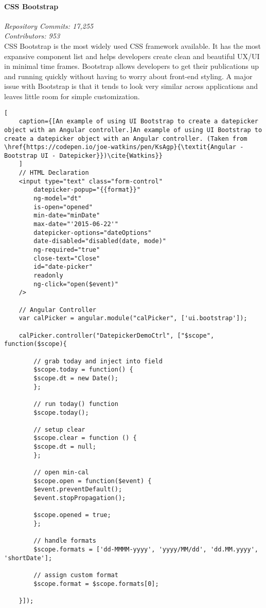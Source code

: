 \paragraph{CSS Bootstrap}
\textit{Repository Commits: 17,255}\\ 
\textit{Contributors: 953}\\
CSS Bootstrap is the most widely used CSS framework available. It has the most expansive component list and helps developers create clean and beautiful UX/UI in minimal time frames. Bootstrap allows developers to get their publications up and running quickly without having to worry about front-end styling. A major issue with Bootstrap is that it tends to look very similar across applications and leaves little room for simple customization.\\
\begin{lstlisting}[
    caption={[An example of using UI Bootstrap to create a datepicker object with an Angular controller.]An example of using UI Bootstrap to create a datepicker object with an Angular controller. (Taken from \href{https://codepen.io/joe-watkins/pen/KsAgp}{\textit{Angular - Bootstrap UI - Datepicker}})\cite{Watkins}}
    ]
    // HTML Declaration
    <input type="text" class="form-control" 
        datepicker-popup="{{format}}" 
        ng-model="dt" 
        is-open="opened" 
        min-date="minDate" 
        max-date="'2015-06-22'"
        datepicker-options="dateOptions" 
        date-disabled="disabled(date, mode)" 
        ng-required="true" 
        close-text="Close" 
        id="date-picker" 
        readonly
        ng-click="open($event)"
    />

    // Angular Controller
    var calPicker = angular.module("calPicker", ['ui.bootstrap']);
    
    calPicker.controller("DatepickerDemoCtrl", ["$scope", function($scope){
        
        // grab today and inject into field
        $scope.today = function() {
        $scope.dt = new Date();
        };
        
        // run today() function
        $scope.today();
    
        // setup clear
        $scope.clear = function () {
        $scope.dt = null;
        };
    
        // open min-cal
        $scope.open = function($event) {
        $event.preventDefault();
        $event.stopPropagation();
    
        $scope.opened = true;
        };
        
        // handle formats
        $scope.formats = ['dd-MMMM-yyyy', 'yyyy/MM/dd', 'dd.MM.yyyy', 'shortDate'];
        
        // assign custom format
        $scope.format = $scope.formats[0];
        
    }]);
\end{lstlisting}
